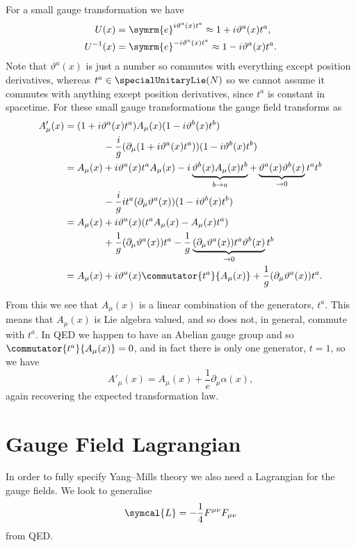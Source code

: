 \documentclass[fleqn]{NotesClass}
\newcommand{\e}{\symrm{e}}
\newcommand{\lagrangianDensity}{\symcal{L}}
\begin{document}
    For a small gauge transformation we have
    \begin{align}
        U(x) &= \e^{i\vartheta^a(x)t^a} \approx 1 + i\vartheta^a(x)t^a,\\
        U^{-1}(x) &= \e^{-i\vartheta^a(x)t^a} \approx 1 - i\vartheta^a(x)t^a.
    \end{align}
    Note that \(\vartheta^a(x)\) is just a number so commutes with everything except position derivatives, whereas \(t^a \in \specialUnitaryLie(N)\) so we cannot assume it commutes with anything except position derivatives, since \(t^a\) is constant in spacetime.
    For these small gauge transformations the gauge field transforms as
    \begin{align}
        A_\mu'(x) &= (1 + i\vartheta^a(x)t^a)A_\mu(x)(1 - i\vartheta^b(x)t^b) \notag\\
        &\qquad\qquad - \frac{i}{g}(\partial_\mu(1 + i\vartheta^a(x)t^a))(1 - i\vartheta^b(x)t^b)\\
        &= A_\mu(x) + i\vartheta^a(x)t^aA_\mu(x) - i\underbrace{\vartheta^b(x)A_\mu(x)t^b}_{b \to a} + \underbrace{\vartheta^a(x)\vartheta^b(x)}_{\to 0}t^at^b \notag\\
        &\qquad\qquad - \frac{i}{g}it^a(\partial_\mu \vartheta^a(x))(1 - i\vartheta^b(x)t^b)\\
        &= A_\mu(x) + i\vartheta^a(x)(t^a A_\mu(x) - A_\mu(x)t^a)\\
        &\qquad\qquad + \frac{1}{g}(\partial_\mu\vartheta^a(x))t^a - \frac{1}{g} \underbrace{(\partial_\mu\vartheta^a(x))t^a\vartheta^b(x)}_{\to 0} t^b\\
        &= A_\mu(x) + i\vartheta^a(x)\commutator{t^a}{A_\mu(x)} + \frac{1}{g}(\partial_\mu \vartheta^a(x))t^a.
    \end{align}
    
    From this we see that \(A_\mu(x)\) is a linear combination of the generators, \(t^a\).
    This means that \(A_\mu(x)\) is Lie algebra valued, and so does not, in general, commute with \(t^a\).
    In QED we happen to have an Abelian gauge group and so \(\commutator{t^a}{A_\mu(x)} = 0\), and in fact there is only one generator, \(t = 1\), so we have
    \begin{equation}
        A'_\mu(x) = A_\mu(x) + \frac{1}{e}\partial_\mu\alpha(x),
    \end{equation}
    again recovering the expected transformation law.
    
    \section{Gauge Field Lagrangian}
    In order to fully specify Yang--Mills theory we also need a Lagrangian for the gauge fields.
    We look to generalise
    \begin{equation}
        \lagrangianDensity = -\frac{1}{4}F^{\mu\nu}F_{\mu\nu}
    \end{equation}
    from QED.
    
\end{document}
